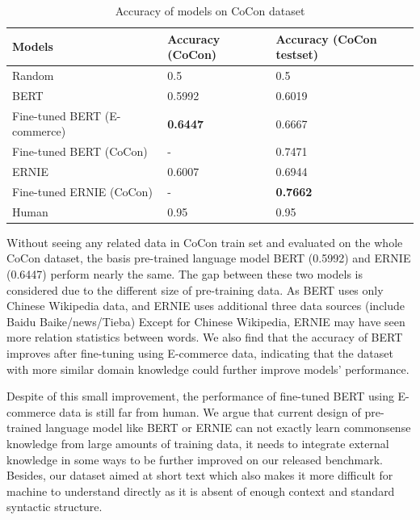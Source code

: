 \begin{table}
	\small
	\centering
	\begin{tabular}{p{2.5cm}p{2cm}p{2cm}}
		\toprule[1.1pt]
		Models & Accuracy (CoCon) & Accuracy (CoCon testset) \\
		\midrule[0.75pt]
		Random & 0.5 & 0.5\\
		BERT & 0.5992 & 0.6019\\
		Fine-tuned BERT (E-commerce)  & \textbf{0.6447} & 0.6667\\
		Fine-tuned BERT (CoCon) & - & 0.7471\\ %
		ERNIE & 0.6007 & 0.6944\\
		Fine-tuned ERNIE (CoCon) & - & \textbf{0.7662} \\ %
		\midrule[0.75pt]
		Human&0.95&0.95\\
		\bottomrule[1.1pt]
	\end{tabular}
	\caption{Accuracy of models on CoCon dataset}
	\label{tab:ExpRes}
\end{table}


Without seeing any related data in CoCon train set and evaluated on the whole CoCon dataset, the basis pre-trained language model BERT (0.5992) and ERNIE (0.6447) perform nearly the same. 
The gap between these two models is considered due to the different size of pre-training data. As BERT uses only Chinese Wikipedia data, and ERNIE uses %
additional three data sources (include Baidu Baike/news/Tieba)  Except for Chinese Wikipedia, ERNIE may have seen more relation statistics between words. We also find that the accuracy of BERT improves after fine-tuning using E-commerce data, indicating that the dataset with more similar domain knowledge could further improve models' performance.

Despite of this small improvement, the performance of fine-tuned BERT using E-commerce data is still far from human. We argue that current design of pre-trained language model like BERT or ERNIE can not exactly learn commonsense knowledge from large amounts of training data, it needs to integrate external knowledge in some ways to be further %
improved on our released benchmark. Besides, our dataset aimed at short text which also makes it more difficult for machine to understand directly as it is absent of enough context and standard syntactic structure.

